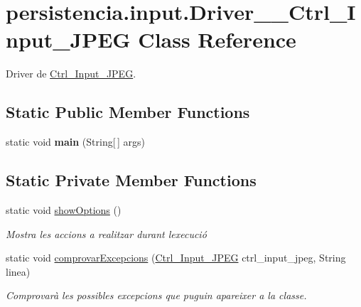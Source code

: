 \hypertarget{classpersistencia_1_1input_1_1Driver____Ctrl__Input__JPEG}{}\section{persistencia.\+input.\+Driver\+\_\+\+\_\+\+Ctrl\+\_\+\+Input\+\_\+\+J\+P\+EG Class Reference}
\label{classpersistencia_1_1input_1_1Driver____Ctrl__Input__JPEG}


Driver de \hyperlink{classpersistencia_1_1input_1_1Ctrl__Input__JPEG}{Ctrl\+\_\+\+Input\+\_\+\+J\+P\+EG}.  


\subsection*{Static Public Member Functions}
\begin{DoxyCompactItemize}
\item 
\mbox{\label{classpersistencia_1_1input_1_1Driver____Ctrl__Input__JPEG_ae46ec7babdaa3cf25854b21c693c4165}} 
static void {\bfseries main} (String\mbox{[}$\,$\mbox{]} args)
\end{DoxyCompactItemize}
\subsection*{Static Private Member Functions}
\begin{DoxyCompactItemize}
\item 
\mbox{\label{classpersistencia_1_1input_1_1Driver____Ctrl__Input__JPEG_a3ffde336b648d23ae0a517210d0f8f38}} 
static void \hyperlink{classpersistencia_1_1input_1_1Driver____Ctrl__Input__JPEG_a3ffde336b648d23ae0a517210d0f8f38}{show\+Options} ()
\begin{DoxyCompactList}\small\item\em Mostra les accions a realitzar durant l\textquotesingle{}execució \end{DoxyCompactList}\item 
static void \hyperlink{classpersistencia_1_1input_1_1Driver____Ctrl__Input__JPEG_ad40099d3188e58f93a2a57c4277b754e}{comprovar\+Excepcions} (\hyperlink{classpersistencia_1_1input_1_1Ctrl__Input__JPEG}{Ctrl\+\_\+\+Input\+\_\+\+J\+P\+EG} ctrl\+\_\+input\+\_\+jpeg, String linea)
\begin{DoxyCompactList}\small\item\em Comprovarà les possibles excepcions que puguin apareixer a la classe. \end{DoxyCompactList}\end{DoxyCompactItemize}



